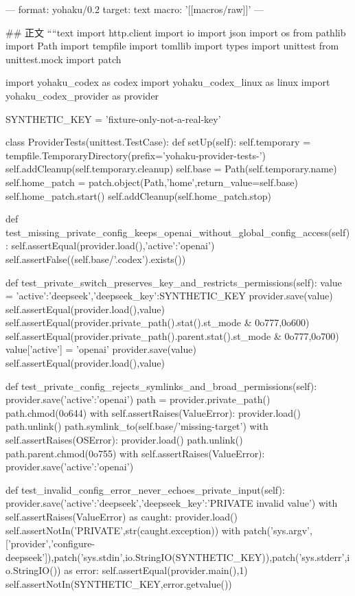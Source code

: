 ---
format: yohaku/0.2
target: text
macro: '[[macros/raw]]'
---

## 正文
````text
import http.client
import io
import json
import os
from pathlib import Path
import tempfile
import tomllib
import types
import unittest
from unittest.mock import patch

import yohaku_codex as codex
import yohaku_codex_linux as linux
import yohaku_codex_provider as provider

SYNTHETIC_KEY = 'fixture-only-not-a-real-key'


class ProviderTests(unittest.TestCase):
    def setUp(self):
        self.temporary = tempfile.TemporaryDirectory(prefix='yohaku-provider-tests-')
        self.addCleanup(self.temporary.cleanup)
        self.base = Path(self.temporary.name)
        self.home_patch = patch.object(Path,'home',return_value=self.base)
        self.home_patch.start()
        self.addCleanup(self.home_patch.stop)

    def test_missing_private_config_keeps_openai_without_global_config_access(self):
        self.assertEqual(provider.load(),{'active':'openai'})
        self.assertFalse((self.base/'.codex').exists())

    def test_private_switch_preserves_key_and_restricts_permissions(self):
        value = {'active':'deepseek','deepseek_key':SYNTHETIC_KEY}
        provider.save(value)
        self.assertEqual(provider.load(),value)
        self.assertEqual(provider.private_path().stat().st_mode & 0o777,0o600)
        self.assertEqual(provider.private_path().parent.stat().st_mode & 0o777,0o700)
        value['active'] = 'openai'
        provider.save(value)
        self.assertEqual(provider.load(),value)

    def test_private_config_rejects_symlinks_and_broad_permissions(self):
        provider.save({'active':'openai'})
        path = provider.private_path()
        path.chmod(0o644)
        with self.assertRaises(ValueError):
            provider.load()
        path.unlink()
        path.symlink_to(self.base/'missing-target')
        with self.assertRaises(OSError):
            provider.load()
        path.unlink()
        path.parent.chmod(0o755)
        with self.assertRaises(ValueError):
            provider.save({'active':'openai'})

    def test_invalid_config_error_never_echoes_private_input(self):
        provider.save({'active':'deepseek','deepseek_key':'PRIVATE invalid value'})
        with self.assertRaises(ValueError) as caught:
            provider.load()
        self.assertNotIn('PRIVATE',str(caught.exception))
        with patch('sys.argv',['provider','configure-deepseek']),patch('sys.stdin',io.StringIO(SYNTHETIC_KEY)),patch('sys.stderr',io.StringIO()) as error:
            self.assertEqual(provider.main(),1)
        self.assertNotIn(SYNTHETIC_KEY,error.getvalue())

